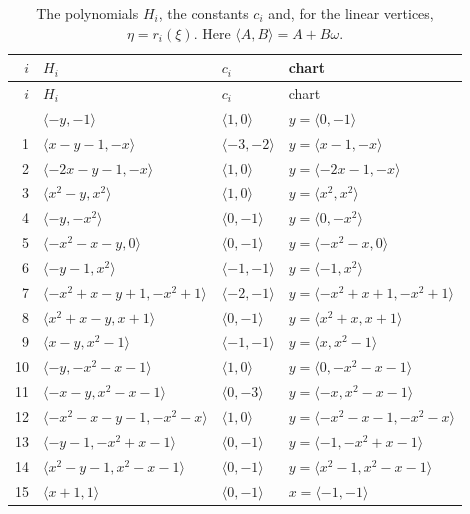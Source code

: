 \documentclass[11pt]{article}
\begin{document}
\clearpage
\begingroup\small
\setlength{\LTcapwidth}{\textwidth}
\begin{longtable}{@{}rlll@{}}
\caption{The polynomials $H_i$, the constants $c_i$ and, for the linear vertices, $\eta=r_i(\xi)$. Here $\langle A,B\rangle=A+B\omega$.}\label{tab:vert1}\\
\hline $i$ & $H_i$ & $c_i$ & chart\\\hline\endfirsthead\hline $i$ & $H_i$ & $c_i$ & chart\\\hline\endhead\hline\endfoot
0 & $\langle -y,-1\rangle$ & $\langle 1,0\rangle$ & $y=\langle 0,-1\rangle$\\
1 & $\langle x-y-1,-x\rangle$ & $\langle -3,-2\rangle$ & $y=\langle x-1,-x\rangle$\\
2 & $\langle -2x-y-1,-x\rangle$ & $\langle 1,0\rangle$ & $y=\langle -2x-1,-x\rangle$\\
3 & $\langle x^{2}-y,x^{2}\rangle$ & $\langle 1,0\rangle$ & $y=\langle x^{2},x^{2}\rangle$\\
4 & $\langle -y,-x^{2}\rangle$ & $\langle 0,-1\rangle$ & $y=\langle 0,-x^{2}\rangle$\\
5 & $\langle -x^{2}-x-y,0\rangle$ & $\langle 0,-1\rangle$ & $y=\langle -x^{2}-x,0\rangle$\\
6 & $\langle -y-1,x^{2}\rangle$ & $\langle -1,-1\rangle$ & $y=\langle -1,x^{2}\rangle$\\
7 & $\langle -x^{2}+x-y+1,-x^{2}+1\rangle$ & $\langle -2,-1\rangle$ & $y=\langle -x^{2}+x+1,-x^{2}+1\rangle$\\
8 & $\langle x^{2}+x-y,x+1\rangle$ & $\langle 0,-1\rangle$ & $y=\langle x^{2}+x,x+1\rangle$\\
9 & $\langle x-y,x^{2}-1\rangle$ & $\langle -1,-1\rangle$ & $y=\langle x,x^{2}-1\rangle$\\
10 & $\langle -y,-x^{2}-x-1\rangle$ & $\langle 1,0\rangle$ & $y=\langle 0,-x^{2}-x-1\rangle$\\
11 & $\langle -x-y,x^{2}-x-1\rangle$ & $\langle 0,-3\rangle$ & $y=\langle -x,x^{2}-x-1\rangle$\\
12 & $\langle -x^{2}-x-y-1,-x^{2}-x\rangle$ & $\langle 1,0\rangle$ & $y=\langle -x^{2}-x-1,-x^{2}-x\rangle$\\
13 & $\langle -y-1,-x^{2}+x-1\rangle$ & $\langle 0,-1\rangle$ & $y=\langle -1,-x^{2}+x-1\rangle$\\
14 & $\langle x^{2}-y-1,x^{2}-x-1\rangle$ & $\langle 0,-1\rangle$ & $y=\langle x^{2}-1,x^{2}-x-1\rangle$\\
15 & $\langle x+1,1\rangle$ & $\langle 0,-1\rangle$ & $x=\langle -1,-1\rangle$\\

\end{longtable}
\end{document}
